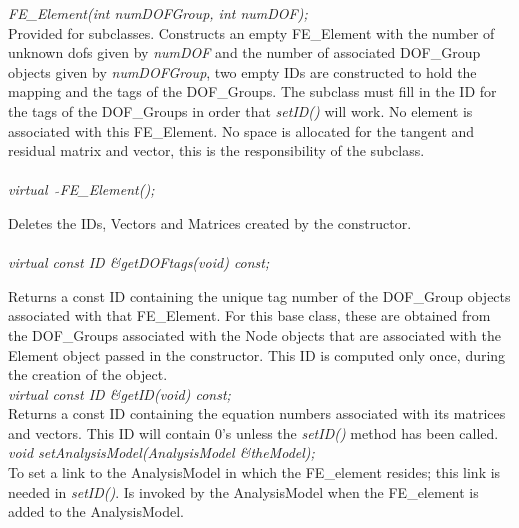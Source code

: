 {\em FE\_Element(int numDOFGroup, int numDOF);}  \\
Provided for subclasses. Constructs an empty FE\_Element with the
number of unknown dofs given by {\em numDOF} and the number of
associated DOF\_Group objects given by {\em numDOFGroup}, two empty IDs
are constructed to hold the mapping and the tags of the
DOF\_Groups. The subclass must fill in the ID for the tags of the
DOF\_Groups in order that {\em setID()} will work. No element is
associated with this FE\_Element. No space is allocated for the
tangent and residual matrix and vector, this is the responsibility of
the subclass. \\  

  \\
{\em virtual~ $\tilde{}$FE\_Element();}  

Deletes the IDs, Vectors and Matrices created by the constructor. \\

  \\
{\em virtual const ID \&getDOFtags(void) const;} 

Returns a const ID containing the unique tag number of the
DOF\_Group objects associated with that FE\_Element. For this base class,
these are obtained from the DOF\_Groups associated with the Node objects
that are associated with the Element object passed in the constructor. This
ID is computed only once, during the creation of the object. \\

{\em virtual const ID \&getID(void) const;} \\
Returns a const ID containing the equation numbers associated with its
matrices and vectors. This ID will contain $0$'s unless the {\em
setID()} method has been called.\\

{\em void setAnalysisModel(AnalysisModel \&theModel);} \\
To set a link to the AnalysisModel in which the FE\_element
resides; this link is needed in {\em setID()}. Is invoked by the
AnalysisModel when the FE\_element is added to the AnalysisModel. \\



